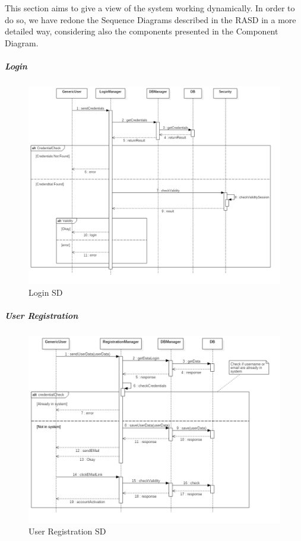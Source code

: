 This section aims to give a view of the system working dynamically. In order to do so, we have redone the Sequence Diagrams described in the RASD in a more detailed way, considering also the components presented in the Component Diagram.

\subparagraph{Login}
    \begin{figure}[H]
        \centering
        \includegraphics[width=18cm, angle =90]{./Images/SD_Login.png}
        \caption{Login SD}
    \end{figure}

\subparagraph{User Registration}
    \begin{figure}[H]
        \centering
        \includegraphics[width=18cm, angle =90]{./Images/SD_Registration.png}
        \caption{User Registration SD}
    \end{figure}  

